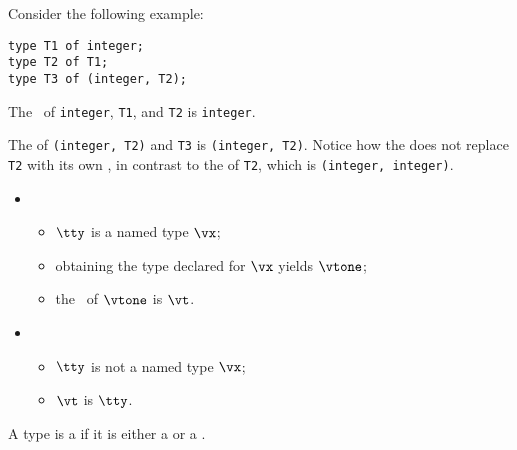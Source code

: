 Consider the following example:
\begin{lstlisting}
type T1 of integer;
type T2 of T1;
type T3 of (integer, T2);
\end{lstlisting}

The \underlyingtypesterm\ of \texttt{integer}, \texttt{T1}, and \texttt{T2} is \texttt{integer}.

The \underlyingtypeterm{} of \texttt{(integer, T2)} and \texttt{T3} is
\texttt{(integer, T2)}.  Notice how the \underlyingtypeterm{} does not replace
\texttt{T2} with its own \underlyingtypeterm, in contrast to the \structureterm{} of
\texttt{T2}, which is \texttt{(integer, integer)}.

\ProseParagraph
\OneApplies
\begin{itemize}
  \item {}
  \begin{itemize}
    \item $\tty$ is a named type $\vx$;
    \item obtaining the type declared for $\vx$ yields $\vtone$\ProseOrTypeError;
    \item the \underlyingtypeterm\ of $\vtone$ is $\vt$.
  \end{itemize}

  \item {}
  \begin{itemize}
    \item $\tty$ is not a named type $\vx$;
    \item $\vt$ is $\tty$.
  \end{itemize}
\end{itemize}

\FormallyParagraph
{}

A type is a \emph{\constrainedintegerterm} if it is either a \wellconstrainedintegertypeterm{}
or a \parameterizedintegertypeterm.


